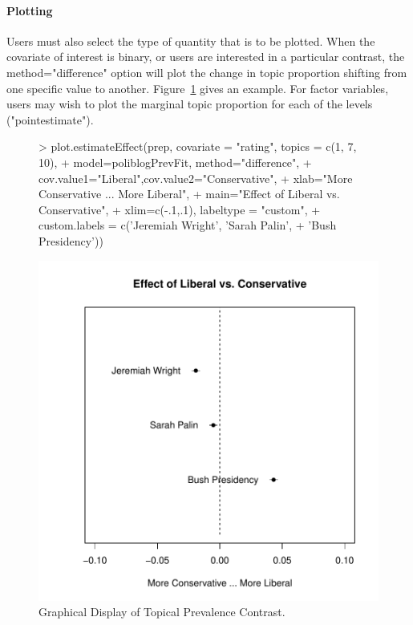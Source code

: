 \documentclass[nojss]{jss}
\begin{document}
\paragraph{Plotting}

Users must also select the type of quantity that is to be plotted. When the covariate of interest is binary, or users are interested in a particular contrast, the method="difference" option will plot the change in topic proportion shifting from one specific value to another. Figure~\ref{fig:difference} gives an example. For factor variables, users may wish to plot the marginal topic proportion for each of the levels ("pointestimate").


\begin{figure}
\begin{center}
\begin{Schunk}
\begin{Sinput}
> plot.estimateEffect(prep, covariate = "rating", topics = c(1, 7, 10),
+         model=poliblogPrevFit, method="difference",
+         cov.value1="Liberal",cov.value2="Conservative",
+         xlab="More Conservative ... More Liberal",
+         main="Effect of Liberal vs. Conservative",
+         xlim=c(-.1,.1), labeltype = "custom",
+         custom.labels = c('Jeremiah Wright', 'Sarah Palin', 
+                           'Bush Presidency'))
\end{Sinput}
\end{Schunk}
\includegraphics{stmVignette-015}
\caption{Graphical Display of Topical Prevalence Contrast.}
\label{fig:difference}
\end{center}
\end{figure}
\end{document}

